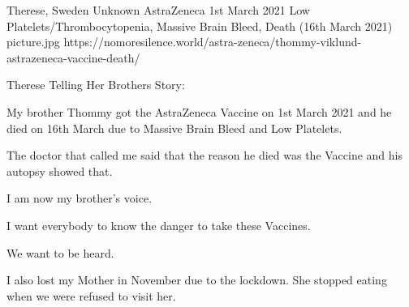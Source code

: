{Therese, Sweden}
{Unknown}
{AstraZeneca}
{1st March 2021}
{Low Platelets/Thrombocytopenia, Massive Brain Bleed, Death (16th March 2021)}
{picture.jpg}
{https://nomoresilence.world/astra-zeneca/thommy-viklund-astrazeneca-vaccine-death/}
{

Therese Telling Her Brothers Story:

My brother Thommy got the AstraZeneca Vaccine on 1st March 2021 and he died on
16th March due to Massive Brain Bleed and Low Platelets.

The doctor that called me said that the reason he died was the Vaccine and his
autopsy showed that.

I am now my brother’s voice.

I want everybody to know the danger to take these Vaccines.

We want to be heard.

I also lost my Mother in November due to the lockdown. She stopped eating when
we were refused to visit her.

}
